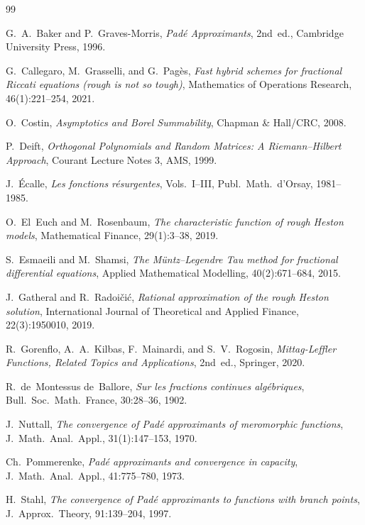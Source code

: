 \documentclass[12pt,a4paper]{amsart}
\theoremstyle{plain}
\theoremstyle{definition}
\theoremstyle{remark}
\begin{document}
\begin{thebibliography}{99}

G.~A.~Baker and P.~Graves-Morris,
\emph{Pad\'e Approximants}, 2nd~ed.,
Cambridge University Press, 1996.

G.~Callegaro, M.~Grasselli, and G.~Pag\`es,
\emph{Fast hybrid schemes for fractional Riccati equations (rough is not so tough)},
Mathematics of Operations Research, 46(1):221--254, 2021.

O.~Costin,
\emph{Asymptotics and Borel Summability},
Chapman \& Hall/CRC, 2008.

P.~Deift,
\emph{Orthogonal Polynomials and Random Matrices: A Riemann--Hilbert Approach},
Courant Lecture Notes 3, AMS, 1999.

J.~\'Ecalle,
\emph{Les fonctions r\'esurgentes}, Vols.~I--III,
Publ.\ Math.\ d'Orsay, 1981--1985.

O.~El~Euch and M.~Rosenbaum,
\emph{The characteristic function of rough Heston models},
Mathematical Finance, 29(1):3--38, 2019.

S.~Esmaeili and M.~Shamsi,
\emph{The M\"untz--Legendre Tau method for fractional differential equations},
Applied Mathematical Modelling, 40(2):671--684, 2015.

J.~Gatheral and R.~Radoi\v{c}i\'c,
\emph{Rational approximation of the rough Heston solution},
International Journal of Theoretical and Applied Finance, 22(3):1950010, 2019.

R.~Gorenflo, A.~A.~Kilbas, F.~Mainardi, and S.~V.~Rogosin,
\emph{Mittag-Leffler Functions, Related Topics and Applications}, 2nd~ed.,
Springer, 2020.

R.~de~Montessus de~Ballore,
\emph{Sur les fractions continues alg\'ebriques},
Bull.\ Soc.\ Math.\ France, 30:28--36, 1902.

J.~Nuttall,
\emph{The convergence of Pad\'e approximants of meromorphic functions},
J.\ Math.\ Anal.\ Appl., 31(1):147--153, 1970.

Ch.~Pommerenke,
\emph{Pad\'e approximants and convergence in capacity},
J.\ Math.\ Anal.\ Appl., 41:775--780, 1973.

H.~Stahl,
\emph{The convergence of Pad\'e approximants to functions with branch points},
J.\ Approx.\ Theory, 91:139--204, 1997.

\end{thebibliography}
\end{document}
